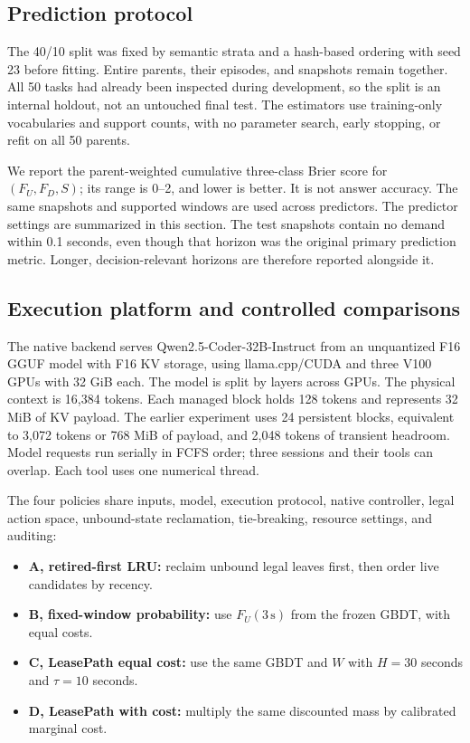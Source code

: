 \documentclass[sigconf, screen, review, balance=false]{acmart}
\providecommand{\tightlist}{\setlength{\itemsep}{0pt}\setlength{\parskip}{0pt}}
\begin{document}
\subsection{Prediction protocol}\label{prediction-protocol}

The 40/10 split was fixed by semantic strata and a hash-based ordering
with seed 23 before fitting. Entire parents, their episodes, and
snapshots remain together. All 50 tasks had already been inspected
during development, so the split is an internal holdout, not an
untouched final test. The estimators use training-only vocabularies and
support counts, with no parameter search, early stopping, or refit on
all 50 parents.

We report the parent-weighted cumulative three-class Brier score for
\((F_U,F_D,S)\); its range is 0--2, and lower is better. It is not
answer accuracy. The same snapshots and supported windows are used
across predictors. The predictor settings are summarized in this section.
The test snapshots contain no demand within 0.1 seconds, even though
that horizon was the original primary prediction metric. Longer,
decision-relevant horizons are therefore reported alongside it.

\subsection{Execution platform and controlled
comparisons}\label{execution-platform-and-controlled-comparisons}

The native backend serves Qwen2.5-Coder-32B-Instruct from an unquantized
F16 GGUF model with F16 KV storage, using llama.cpp/CUDA and three V100
GPUs with 32 GiB each. The model is split by layers across GPUs. The
physical context is 16,384 tokens. Each managed block holds 128 tokens
and represents 32 MiB of KV payload. The earlier experiment uses 24
persistent blocks, equivalent to 3,072 tokens or 768 MiB of payload, and
2,048 tokens of transient headroom. Model requests run serially in FCFS
order; three sessions and their tools can overlap. Each tool uses one
numerical thread.

The four policies share inputs, model, execution protocol, native
controller, legal action space, unbound-state reclamation, tie-breaking,
resource settings, and auditing:

\begin{itemize}
\tightlist
\item
  \textbf{A, retired-first LRU:} reclaim unbound legal leaves first,
  then order live candidates by recency.
\item
  \textbf{B, fixed-window probability:} use \(F_U(3\,\mathrm{s})\) from
  the frozen GBDT, with equal costs.
\item
  \textbf{C, LeasePath equal cost:} use the same GBDT and \(W\) with
  \(H=30\) seconds and \(\tau=10\) seconds.
\item
  \textbf{D, LeasePath with cost:} multiply the same discounted mass by
  calibrated marginal cost.
\end{itemize}
\end{document}
